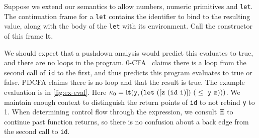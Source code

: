 Suppose we extend our semantics to allow numbers, numeric primitives and \texttt{let}.
%
The continuation frame for a \texttt{let} contains the identifier to bind to the resulting value, along with the body of the \texttt{let} with its environment.
%
Call the constructor of this frame $\mathbf{lt}$.

We should expect that a pushdown analysis would predict this evaluates to true, and there are no loops in the program.
%
0-CFA~\citep{dvanhorn:Shivers:1991:CFA} claims there is a loop from the second call of \texttt{id} to the first, and thus predicts this program evaluates to true or false.
%
PDCFA claims there is no loop and that the result is true.
%
The example evaluation is in \autoref{fig:ex-eval}.
%
Here $\mkont_0 = \mathbf{lt}({\tt y}, {\tt (let\ ([z\ (id\ 1)])\ (}\le\ {\tt y}\ {\tt z))})$.
%
We maintain enough context to distinguish the return points of \texttt{id} to not rebind \texttt{y} to 1.
%
When determining control flow through the expression, we consult $\Xi$ to continue past function returns, so there is no confusion about a back edge from the second call to \texttt{id}.
%

